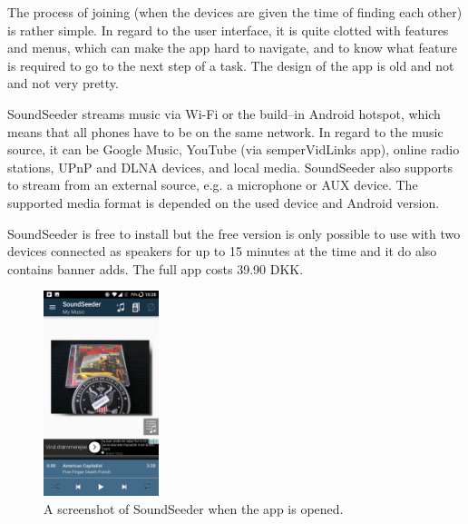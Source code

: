 The process of joining (when the devices are given the time of finding each other) is rather simple.
In regard to the user interface, it is quite clotted with features and menus, which can make the app hard to navigate,
and to know what feature is required to go to the next step of a task.
The design of the app is old and not and not very pretty.

SoundSeeder streams music via Wi-Fi or the build--in Android hotspot\cite{soundseether_faq}, 
which means that all phones have to be on the same network.
In regard to the music source, it can be Google Music, YouTube (via semperVidLinks app), online radio stations, UPnP and DLNA devices, and local media.
SoundSeeder also supports to stream from an external source, e.g. a microphone or AUX device. 
The supported media format is depended on the used device and Android version.\cite{soundseether_faq}

SoundSeeder is free to install but the free version is only possible to use with two devices connected as speakers for up to 15 minutes at the time and it do also contains banner adds.
The full app costs 39.90 DKK. 

\begin{figure}[h!]
    \centering
    \includegraphics[width=0.3\textwidth]{img/sota/soundseeder.png}
    \caption{A screenshot of SoundSeeder when the app is opened.}
    \label{fig:soundseeder_screenshot}
\end{figure}

